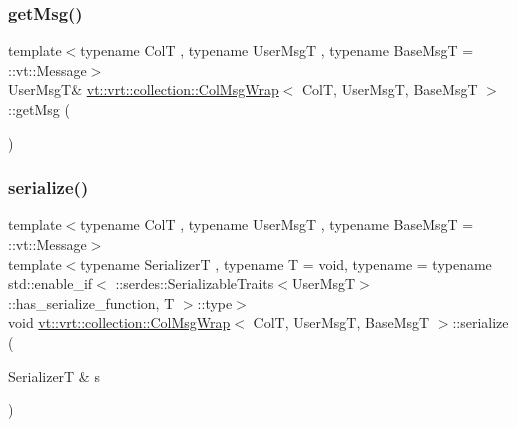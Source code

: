 \subsubsection{\texorpdfstring{get\+Msg()}{getMsg()}}
{\footnotesize\ttfamily template$<$typename ColT , typename User\+MsgT , typename Base\+MsgT  = \+::vt\+::\+Message$>$ \\
User\+MsgT\& \hyperlink{structvt_1_1vrt_1_1collection_1_1_col_msg_wrap}{vt\+::vrt\+::collection\+::\+Col\+Msg\+Wrap}$<$ ColT, User\+MsgT, Base\+MsgT $>$\+::get\+Msg (\begin{DoxyParamCaption}{ }\end{DoxyParamCaption})\hspace{0.3cm}{\ttfamily [inline]}}

\mbox{\label{structvt_1_1vrt_1_1collection_1_1_col_msg_wrap_ad225439a1358090be0ad57cb536eb1d3}} 
\subsubsection{\texorpdfstring{serialize()}{serialize()}}
{\footnotesize\ttfamily template$<$typename ColT , typename User\+MsgT , typename Base\+MsgT  = \+::vt\+::\+Message$>$ \\
template$<$typename SerializerT , typename T  = void, typename  = typename std\+::enable\+\_\+if$<$      \+::serdes\+::\+Serializable\+Traits$<$\+User\+Msg\+T$>$\+::has\+\_\+serialize\+\_\+function, T    $>$\+::type$>$ \\
void \hyperlink{structvt_1_1vrt_1_1collection_1_1_col_msg_wrap}{vt\+::vrt\+::collection\+::\+Col\+Msg\+Wrap}$<$ ColT, User\+MsgT, Base\+MsgT $>$\+::serialize (\begin{DoxyParamCaption}\item[{SerializerT \&}]{s }\end{DoxyParamCaption})\hspace{0.3cm}{\ttfamily [inline]}}

\mbox{\label{structvt_1_1vrt_1_1collection_1_1_col_msg_wrap_aa9fac3b0fea45495883f2cac5efd79cf}} 
